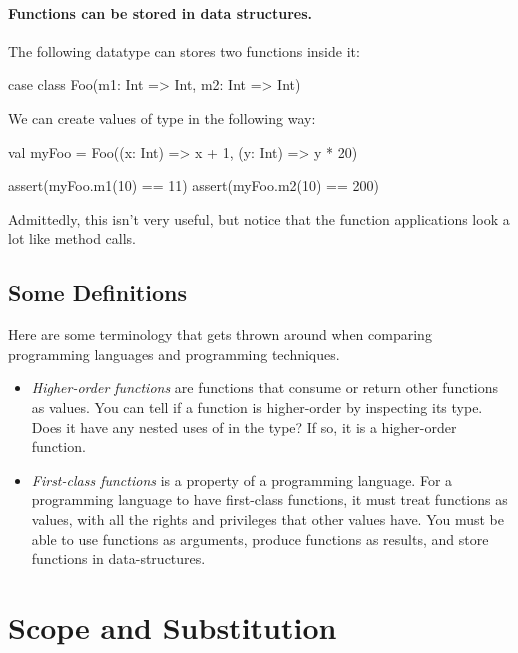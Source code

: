 \documentclass{book}
\begin{document}
\paragraph{Functions can be stored in data structures.}

The following datatype can stores two functions inside it:
%
\begin{scalacode}
case class Foo(m1: Int => Int, m2: Int => Int)
\end{scalacode}

We can create values of type  in the following way:
%
\begin{scalacode}
val myFoo = Foo((x: Int) => x + 1, (y: Int) => y * 20)

assert(myFoo.m1(10) == 11)
assert(myFoo.m2(10) == 200)
\end{scalacode}
%
Admittedly, this isn't very useful, but notice that the function applications
look a lot like method calls.

\subsection{Some Definitions}

Here are some terminology that gets thrown around when comparing programming
languages and programming techniques.

\begin{itemize}

  \item \emph{Higher-order functions} are functions that consume or return other
  functions as values. You can tell if a function is higher-order by inspecting
  its type. Does it have any nested uses of \scalainline{=>} in the type? If so, it is a higher-order
  function.

  \item \emph{First-class functions} is a property of a programming language. For
  a programming language to have first-class functions, it must treat functions
  as values, with all the rights and privileges that other values have. You must
  be able to use functions as arguments, produce functions as results, and store
  functions in data-structures.

\end{itemize}

\section{Scope and Substitution}
\end{document}
